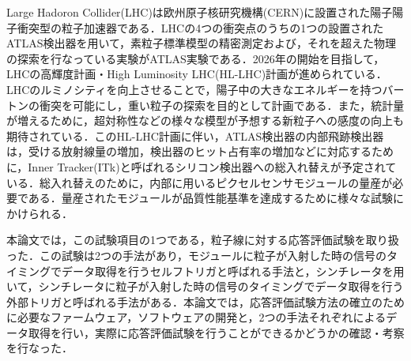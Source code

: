 Large Hadoron Collider(LHC)は欧州原子核研究機構(CERN)に設置された陽子陽子衝突型の粒子加速器である．LHCの4つの衝突点のうちの1つの設置されたATLAS検出器を用いて，素粒子標準模型の精密測定および，それを超えた物理の探索を行なっている実験がATLAS実験である．2026年の開始を目指して，LHCの高輝度計画・High Luminosity LHC(HL-LHC)計画が進められている．LHCのルミノシティを向上させることで，陽子中の大きなエネルギーを持つバートンの衝突を可能にし，重い粒子の探索を目的として計画である．また，統計量が増えるために，超対称性などの様々な模型が予想する新粒子への感度の向上も期待されている．このHL-LHC計画に伴い，ATLAS検出器の内部飛跡検出器は，受ける放射線量の増加，検出器のヒット占有率の増加などに対応するために，Inner Tracker(ITk)と呼ばれるシリコン検出器への総入れ替えが予定されている．総入れ替えのために，内部に用いるピクセルセンサモジュールの量産が必要である．量産されたモジュールが品質性能基準を達成するために様々な試験にかけられる．\par
本論文では，この試験項目の1つである，粒子線に対する応答評価試験を取り扱った．この試験は2つの手法があり，モジュールに粒子が入射した時の信号のタイミングでデータ取得を行うセルフトリガと呼ばれる手法と，シンチレータを用いて，シンチレータに粒子が入射した時の信号のタイミングでデータ取得を行う外部トリガと呼ばれる手法がある．本論文では，応答評価試験方法の確立のために必要なファームウェア，ソフトウェアの開発と，2つの手法それぞれによるデータ取得を行い，実際に応答評価試験を行うことができるかどうかの確認・考察を行なった．





